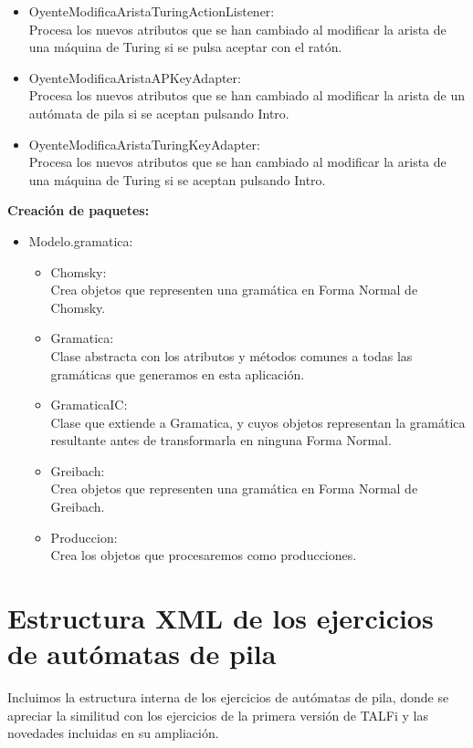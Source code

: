 \documentclass[12pt,a4paper,spanish]{book}
\begin{document}
\begin{itemize}
\begin{itemize}
\item OyenteModificaAristaTuringActionListener:\\Procesa los nuevos atributos que se han cambiado al modificar la arista de una m\'aquina de Turing si se pulsa aceptar con el rat\'on.
\item OyenteModificaAristaAPKeyAdapter:\\Procesa los nuevos atributos que se han cambiado al modificar la arista de un aut\'omata de pila si se aceptan pulsando Intro.
\item OyenteModificaAristaTuringKeyAdapter:\\Procesa los nuevos atributos que se han cambiado al modificar la arista de una m\'aquina de Turing si se aceptan pulsando Intro.
\end{itemize}
\end{itemize}

{\bf Creaci\'{o}n de paquetes:}
\begin{itemize}
\item Modelo.gramatica:\\
\begin{itemize}
\item Chomsky:\\Crea objetos que representen una gram\'atica en Forma Normal de Chomsky.
\item Gramatica:\\Clase abstracta con los atributos y m\'etodos comunes a todas las gram\'aticas que generamos en esta aplicaci\'on.
\item GramaticaIC:\\Clase que extiende a Gramatica, y cuyos objetos representan la gram\'atica resultante antes de transformarla en ninguna Forma Normal.
\item Greibach:\\Crea objetos que representen una gram\'atica en Forma Normal de Greibach.
\item Produccion:\\Crea los objetos que procesaremos como producciones.
\end{itemize}
\end{itemize}

\section{Estructura XML de los ejercicios de aut\'omatas de pila}
Incluimos la estructura interna de los ejercicios de aut\'omatas de pila, donde se apreciar la similitud con los ejercicios de la primera versi\'on de TALFi y las novedades incluidas en su ampliaci\'on.\\
\end{document}
